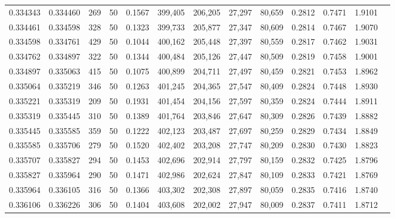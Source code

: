 \begin{tabular}{rrrrrrrrrrrrr}
0.334343 & 0.334460 &   269 &  50 &                                     0.1567 & 399,405 & 206,205 &  27,297 &  80,659 & 0.2812 & 0.7471 & 1.9101 \\
0.334461 & 0.334598 &   328 &  50 &                                     0.1323 & 399,733 & 205,877 &  27,347 &  80,609 & 0.2814 & 0.7467 & 1.9070 \\
0.334598 & 0.334761 &   429 &  50 &                                     0.1044 & 400,162 & 205,448 &  27,397 &  80,559 & 0.2817 & 0.7462 & 1.9031 \\
0.334762 & 0.334897 &   322 &  50 &                                     0.1344 & 400,484 & 205,126 &  27,447 &  80,509 & 0.2819 & 0.7458 & 1.9001 \\
0.334897 & 0.335063 &   415 &  50 &                                     0.1075 & 400,899 & 204,711 &  27,497 &  80,459 & 0.2821 & 0.7453 & 1.8962 \\
0.335064 & 0.335219 &   346 &  50 &                                     0.1263 & 401,245 & 204,365 &  27,547 &  80,409 & 0.2824 & 0.7448 & 1.8930 \\
0.335221 & 0.335319 &   209 &  50 &                                     0.1931 & 401,454 & 204,156 &  27,597 &  80,359 & 0.2824 & 0.7444 & 1.8911 \\
0.335319 & 0.335445 &   310 &  50 &                                     0.1389 & 401,764 & 203,846 &  27,647 &  80,309 & 0.2826 & 0.7439 & 1.8882 \\
0.335445 & 0.335585 &   359 &  50 &                                     0.1222 & 402,123 & 203,487 &  27,697 &  80,259 & 0.2829 & 0.7434 & 1.8849 \\
0.335585 & 0.335706 &   279 &  50 &                                     0.1520 & 402,402 & 203,208 &  27,747 &  80,209 & 0.2830 & 0.7430 & 1.8823 \\
0.335707 & 0.335827 &   294 &  50 &                                     0.1453 & 402,696 & 202,914 &  27,797 &  80,159 & 0.2832 & 0.7425 & 1.8796 \\
0.335827 & 0.335964 &   290 &  50 &                                     0.1471 & 402,986 & 202,624 &  27,847 &  80,109 & 0.2833 & 0.7421 & 1.8769 \\
0.335964 & 0.336105 &   316 &  50 &                                     0.1366 & 403,302 & 202,308 &  27,897 &  80,059 & 0.2835 & 0.7416 & 1.8740 \\
0.336106 & 0.336226 &   306 &  50 &                                     0.1404 & 403,608 & 202,002 &  27,947 &  80,009 & 0.2837 & 0.7411 & 1.8712 \\

\end{tabular}
